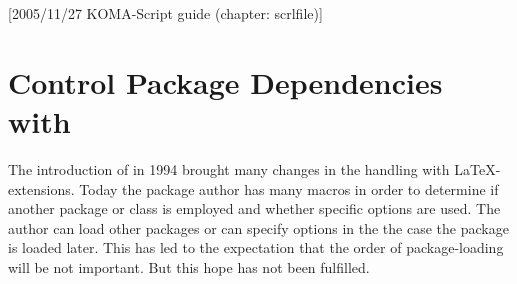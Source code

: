 %
%
%
%
%
%
%
%
% 
%
%
%
%

[2005/11/27 KOMA-Script guide (chapter: scrlfile)]

\chapter{Control Package Dependencies with }


\begin{Explain}
  The introduction of \LaTeXe{} in 1994 brought many changes in the handling
  with \LaTeX-extensions.  Today the package author has many macros in order
  to determine if another package or class is employed and whether specific
  options are used.  The author can load other packages or can specify options
  in the the case the package is loaded later.  This has led to the
  expectation that the order of package-loading will be not important.  But
  this hope has not been fulfilled.
\end{Explain}


